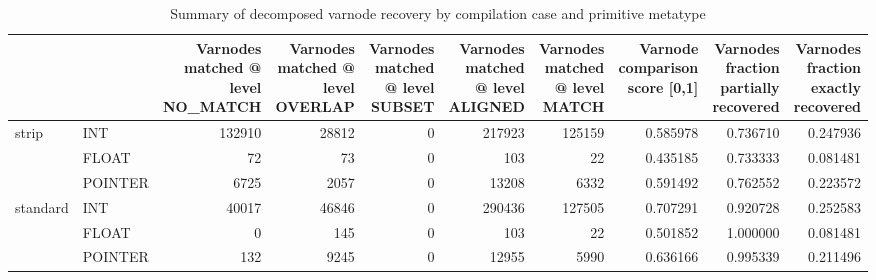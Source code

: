 \begin{table}
\centering
\caption{Summary of decomposed varnode recovery by compilation case and primitive metatype}
\label{table:opts-varnodes-summary-metatypes-decomposed}
\begin{tabular}{llrrrrrrrr}
\toprule
      &         &  Varnodes matched @ level NO\_MATCH &  Varnodes matched @ level OVERLAP &  Varnodes matched @ level SUBSET &  Varnodes matched @ level ALIGNED &  Varnodes matched @ level MATCH &  Varnode comparison score [0,1] &  Varnodes fraction partially recovered &  Varnodes fraction exactly recovered \\
\midrule
\multirow{3}{*}{strip} & INT &                             132910 &                             28812 &                                0 &                            217923 &                          125159 &                        0.585978 &                               0.736710 &                             0.247936 \\
      & FLOAT &                                 72 &                                73 &                                0 &                               103 &                              22 &                        0.435185 &                               0.733333 &                             0.081481 \\
      & POINTER &                               6725 &                              2057 &                                0 &                             13208 &                            6332 &                        0.591492 &                               0.762552 &                             0.223572 \\
\cline{1-10}
\multirow{3}{*}{standard} & INT &                              40017 &                             46846 &                                0 &                            290436 &                          127505 &                        0.707291 &                               0.920728 &                             0.252583 \\
      & FLOAT &                                  0 &                               145 &                                0 &                               103 &                              22 &                        0.501852 &                               1.000000 &                             0.081481 \\
      & POINTER &                                132 &                              9245 &                                0 &                             12955 &                            5990 &                        0.636166 &                               0.995339 &                             0.211496 \\

\end{tabular}
\end{table}
